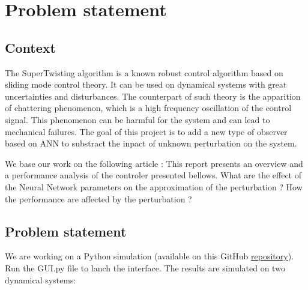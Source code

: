 \chapter{Problem statement}

\section{Context}

The SuperTwisting algorithm is a known robust control algorithm based on sliding mode control %
theory. It can be used on dynamical systems with great uncertainties and disturbances. %
The counterpart of such theory is the apparition of chattering phenomenon, which is a high %
frequency oscillation of the control signal. This phenomenon can be harmful for the system %
and can lead to mechanical failures. The goal of this project is to add a new type of %
observer based on ANN to substract the inpact of unknown perturbation on the system. %

We base our work on the following article \cite{babin2019analysis} : %
This report presents an overview and a performance analysis of the controler presented %
bellows. What are the effect of the Neural Network parameters on the approximation %
of the perturbation ? How the performance are affected by the perturbation ? %

\section{Problem statement}

We are working on a Python simulation (available on this GitHub %
\href{https://github.com/MatisViozelange/SMC_tests/tree/main/CR_observateur_periode2}{repository}). %
Run the GUI.py file to lanch the interface. %
The results are simulated on two dynamical systems:

